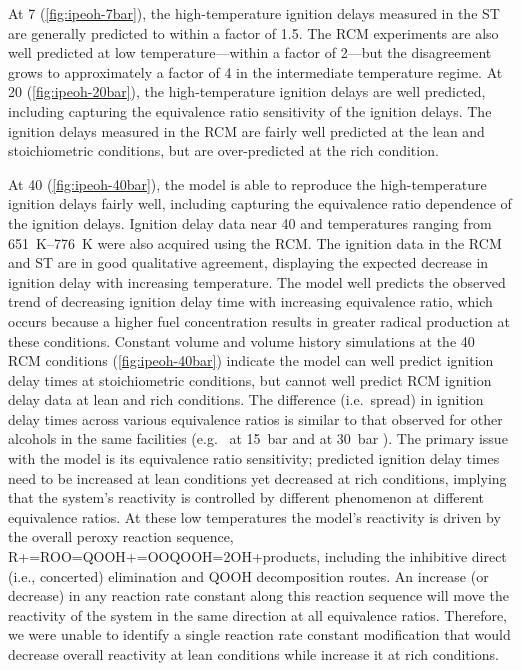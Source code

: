 \documentclass[../main.tex]{subfiles}
\begin{document}
At \SI{7}{\atmosphere} (\cref{fig:ipeoh-7bar}), the high-temperature ignition delays
measured in the ST are generally predicted to within a factor of \num{1.5}. The RCM experiments
are also well predicted at low temperature---within a factor of \num{2}---but
the disagreement grows to approximately a factor of \num{4} in the
intermediate temperature regime. At \SI{20}{\atmosphere} (\cref{fig:ipeoh-20bar}), the
high-temperature ignition delays are well predicted, including
capturing the equivalence ratio sensitivity of the ignition delays.
The ignition delays measured in the RCM are fairly well predicted
at the lean and stoichiometric conditions, but are over-predicted
at the rich condition.

At \SI{40}{\atmosphere} (\cref{fig:ipeoh-40bar}), the model is able to
reproduce the high-temperature ignition delays fairly well, including
capturing the equivalence ratio dependence of the ignition delays.
Ignition delay data near \SI{40}{\atmosphere} and temperatures
ranging from \SIrange{651}{776}{\kelvin} were also acquired using the
RCM. The ignition data in the RCM and ST are in good qualitative
agreement, displaying the expected decrease in ignition delay with
increasing temperature. The model well predicts the observed trend
of decreasing ignition delay time with increasing equivalence
ratio, which occurs because a higher fuel concentration results
in greater radical production at these conditions. Constant volume
and volume history simulations at the \SI{40}{\atmosphere} RCM
conditions (\cref{fig:ipeoh-40bar}) indicate the model can well predict
ignition delay times at stoichiometric conditions, but cannot well predict
RCM ignition delay data at lean and rich conditions. The difference
(i.e.\ spread) in ignition delay times across various equivalence ratios
is similar to that observed for other alcohols in the same facilities
(e.g.\ \nBuOH{} at \SI{15}{\bar} \cite{Weber2011} and \tBuOH{} at
\SI{30}{\bar} \cite{Weber2013}). The primary issue with the model is
its equivalence ratio sensitivity; predicted ignition delay times need
to be increased at lean conditions yet decreased at rich conditions,
implying that the system's reactivity is controlled by different phenomenon
at different equivalence ratios. At these low temperatures the model's
reactivity is driven by the overall peroxy reaction sequence,
R+=ROO=QOOH+=OOQOOH=2OH+products, including the inhibitive
direct (i.e., concerted)  elimination and QOOH decomposition routes.
An increase (or decrease) in any reaction rate constant along this
reaction sequence will move the reactivity of the system in the same
direction at all equivalence ratios. Therefore, we were unable to
identify a single reaction rate constant modification that would decrease
overall reactivity at lean conditions while increase it at rich conditions.
\end{document}
